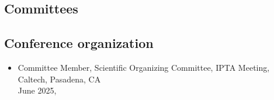 \documentclass[11pt,letterpaper,sans,unicode]{moderncv}
\newcommand{\confitem}[3]{\item {#1}\\{#2}, #3}
\newcommand{\blucirc}{{\color{color1} $\circ\;\;$}}
\begin{document}
{\begin{comment}
\hspace{0.5mm} \blucirc General Relativity \& Gravitation  \hfill \blucirc Monthly Notices of the Royal Astronomical Society

\hspace{0.5mm} \blucirc Physical Review Letters  \hfill \blucirc European Journal of Physics
\end{comment}

\subsection{Committees}

 \vspace{-0.1cm}

\subsection{Conference organization}
	\begin{itemize}[leftmargin=8mm]
	\confitem{Committee Member, Scientific Organizing Committee, IPTA Meeting, Caltech, Pasadena, CA}{June 2025}
	\end{itemize}

}
\end{document}

